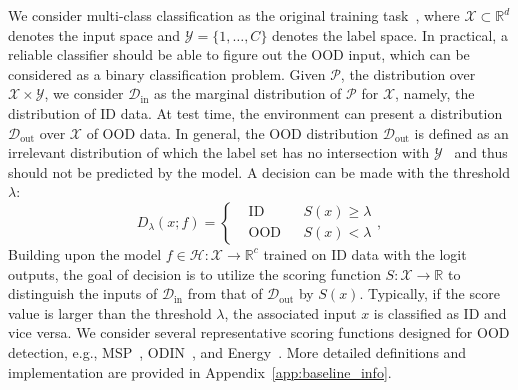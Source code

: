\documentclass{article}
\theoremstyle{plain}
\theoremstyle{definition}
\theoremstyle{remark}
\begin{document}
We consider multi-class classification as the original training task~\citep{Nguyen_2015_CVPR}, where $\mathcal{X}\subset\mathbb{R}^d$ denotes the input space and $\mathcal{Y}=\{1,\ldots, C\}$ denotes the label space. In practical, a reliable classifier should be able to figure out the OOD input, which can be considered as a binary classification problem. Given $\mathcal{P}$, the distribution over $\mathcal{X}\times\mathcal{Y}$, we consider $\mathcal{D}_\text{in}$ as the marginal distribution of $\mathcal{P}$ for $\mathcal{X}$, namely, the distribution of ID data. At test time, the environment can present a distribution $\mathcal{D}_\text{out}$ over $\mathcal{X}$ of OOD data. In general, the OOD distribution $\mathcal{D}_\text{out}$ is defined as an irrelevant distribution of which the label set has no intersection with $\mathcal{Y}$~\cite{yang2021generalized} and thus should not be predicted by the model. A decision can be made with the threshold $\lambda$:
\begin{equation}
    D_{\lambda}(x;f)=\left \{
    \begin{aligned}
    &\text{ID} && S(x)\geq\lambda\\
    &\text{OOD} && S(x)<\lambda
    \end{aligned},
    \right.
\end{equation}
Building upon the model ${f}\in\mathcal{H}:\mathcal{X}\rightarrow\mathbb{R}^c$ trained on ID data with the logit outputs, the goal of decision is to utilize the scoring function $S:\mathcal{X}\rightarrow \mathbb{R}$ to distinguish the inputs of $\mathcal{D}_\text{in}$ from that of $\mathcal{D}_\text{out}$ by $S(x)$. Typically, if the score value is larger than the threshold $\lambda$, the associated input $x$ is classified as ID and vice versa. We consider several representative scoring functions designed for OOD detection, e.g., MSP~\citep{hendrycks17baseline}, ODIN~\citep{LiangLS18}, and Energy~\citep{liu2020energy}. More detailed definitions and implementation are provided in Appendix~\ref{app:baseline_info}.
\end{document}
